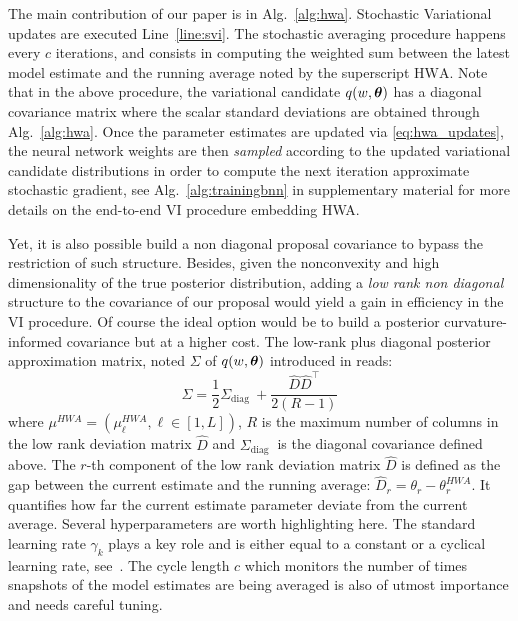 \documentclass[tablecaption=bottom,wcp]{jmlr}
\begin{document}
The main contribution of our paper is in Alg.~\ref{alg:hwa}.
Stochastic Variational updates are executed Line~\ref{line:svi}.
The stochastic averaging procedure happens every $c$ iterations, and consists in computing the weighted sum between the latest model estimate and the running average noted by the superscript $\textrm{HWA}$.
Note that in the above procedure, the variational candidate $q(w, \param)$ has a diagonal covariance matrix where the scalar standard deviations are obtained through Alg.~\ref{alg:hwa}.
Once the parameter estimates are updated via \eqref{eq:hwa_updates}, the neural network weights are then \emph{sampled} according to the updated variational candidate distributions in order to compute the next iteration approximate stochastic gradient, see Alg.~\ref{alg:trainingbnn} in supplementary material for more details on the end-to-end VI procedure embedding HWA.

Yet, it is also possible build a non diagonal proposal covariance to bypass the restriction of such structure.
Besides, given the nonconvexity and high dimensionality of the true posterior distribution, adding a \emph{low rank non diagonal} structure to the covariance of our proposal would yield a gain in efficiency in the VI procedure.
Of course the ideal option would be to build a posterior curvature-informed covariance but at a higher cost.
The low-rank plus diagonal posterior approximation matrix, noted $\Sigma$ of $q(w, \param)$ introduced in \citep{maddox2019simple} reads:
\begin{equation}\label{eq:lowrankcov}
\Sigma = \frac{1}{2} \Sigma_{\text {diag }}+\frac{\widehat{D} \widehat{D}^{\top}}{2(R-1)}
\end{equation}
where $\mu^{HWA} = (\mu_{\ell}^{HWA}, \ell \in [1,L])$, $R$ is the maximum number of columns in the low rank deviation matrix $\widehat{D}$ and $\Sigma_{\text {diag }}$ is the diagonal covariance defined above. 
The $r$-th component of the  low rank deviation matrix $\widehat{D}$ is defined as the gap between the current estimate and the running average: $\widehat{D}_r = \theta_r - \theta^{HWA}_r$. 
It quantifies how far the current estimate parameter deviate from the current average.
Several hyperparameters are worth highlighting here.
The standard learning rate $\gamma_k$ plays a key role and is either equal to a constant or a cyclical learning rate, see~\citep{zhang2019cyclical}.
The cycle length $c$ which monitors the number of times snapshots of the model estimates are being averaged is also of utmost importance and needs careful tuning.
\end{document}
